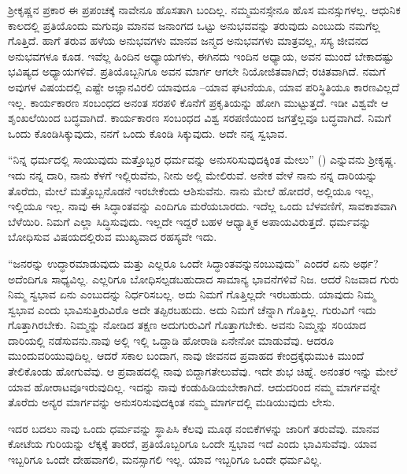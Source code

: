 ಶ‍್ರೀಕೃಷ್ಣನ ಪ್ರಕಾರ ಈ ಪ್ರಪಂಚಕ್ಕೆ ನಾವೇನೂ ಹೊಸತಾಗಿ ಬಂದಿಲ್ಲ. ನಮ್ಮ\break ಮನಸ್ಸೇನೂ ಹೊಸ ಮನಸ್ಸುಗಳಲ್ಲ. ಆಧುನಿಕ ಕಾಲದಲ್ಲಿ ಪ್ರತಿಯೊಂದು ಮಗುವೂ ಮಾನವ ಜನಾಂಗದ ಒಟ್ಟು ಅನುಭವವನ್ನು ತರುವುದು ಎಂಬುದು ನಮಗೆಲ್ಲ ಗೊತ್ತಿದೆ. ಹಾಗೆ ತರುವ ಹಳೆಯ ಅನುಭವಗಳು ಮಾನವ ಜನ್ಮದ ಅನುಭವಗಳು ಮಾತ್ರವಲ್ಲ, ಸಸ್ಯ ಜೀವನದ ಅನುಭವಗಳೂ ಕೂಡ. ಇವೆಲ್ಲ ಹಿಂದಿನ ಅಧ್ಯಾಯಗಳು, ಈಗಿನದು ಇಂದಿನ ಅಧ್ಯಾಯ, ಅವನ ಮುಂದೆ ಬೇಕಾದಷ್ಟು ಭವಿಷ್ಯದ ಅಧ್ಯಾಯಗಳಿವೆ. ಪ್ರತಿಯೊಬ್ಬನಿಗೂ ಅವನ ಮಾರ್ಗ ಆಗಲೇ ನಿಯೋಜಿತವಾಗಿದೆ; ರಚಿತವಾಗಿದೆ. ನಮಗೆ ಅವುಗಳ ವಿಷಯದಲ್ಲಿ ಎಷ್ಟೇ ಅಜ್ಞಾನವಿರಲಿ ಯಾವುದೂ –ಯಾವ ಘಟನೆಯೂ, ಯಾವ ಪರಿಸ್ಥಿತಿಯೂ ಕಾರಣವಿಲ್ಲದೆ ಇಲ್ಲ. ಕಾರ್ಯಕಾರಣ ಸಂಬಂಧದ ಅನಂತ ಸರಪಳಿ ಕೊನೆಗೆ ಪ್ರಕೃತಿಯನ್ನು ಹೋಗಿ ಮುಟ್ಟುತ್ತದೆ. ಇಡೀ ವಿಶ್ವವೇ ಆ ಶೃಂಖಲೆಯಿಂದ ಬದ್ಧವಾಗಿದೆ. ಕಾರ್ಯಕಾರಣ ಸಂಬಂಧದ ವಿಶ್ವ ಸರಪಣಿಯಿಂದ ಜಗತ್ತೆಲ್ಲವೂ ಬದ್ಧವಾಗಿದೆ. ನಿಮಗೆ ಒಂದು ಕೊಂಡಿ\break ಸಿಕ್ಕುವುದು, ನನಗೆ ಒಂದು ಕೊಂಡಿ ಸಿಕ್ಕುವುದು. ಅದೇ ನನ್ನ ಸ್ವಭಾವ.

“ನಿನ್ನ ಧರ್ಮದಲ್ಲಿ ಸಾಯುವುದು ಮತ್ತೊಬ್ಬರ ಧರ್ಮವನ್ನು ಅನುಸರಿಸುವುದಕ್ಕಿಂತ ಮೇಲು” () ಎನ್ನುವನು ಶ‍್ರೀಕೃಷ್ಣ. ಇದು ನನ್ನ ದಾರಿ, ನಾನು ಕೆಳಗೆ ಇಲ್ಲಿರುವೆನು, ನೀನು ಅಲ್ಲಿ ಮೇಲಿರುವೆ. ಅನೇಕ ವೇಳೆ ನಾನು ನನ್ನ ದಾರಿಯನ್ನು ತೊರೆದು, ಮೇಲೆ ಮತ್ತೊಬ್ಬನೊಡನೆ ಇರಬೇಕೆಂದು ಆಶಿಸುವೆನು. ನಾನು ಮೇಲೆ ಹೋದರೆ, ಅಲ್ಲಿಯೂ ಇಲ್ಲ, ಇಲ್ಲಿಯೂ ಇಲ್ಲ. ನಾವು ಈ ಸಿದ್ಧಾಂತವನ್ನು ಎಂದಿಗೂ ಮರೆಯಬಾರದು. ಇದೆಲ್ಲ ಒಂದು ಬೆಳವಣಿಗೆ, ಸಾವಕಾಶವಾಗಿ ಬೆಳೆಯಿರಿ. ನಿಮಗೆ ಎಲ್ಲಾ ಸಿದ್ಧಿಸುವುದು. ಇಲ್ಲದೇ ಇದ್ದರೆ ಬಹಳ ಆಧ್ಯಾತ್ಮಿಕ ಅಪಾಯವಿರುತ್ತದೆ. ಧರ್ಮವನ್ನು ಬೋಧಿಸುವ ವಿಷಯದಲ್ಲಿರುವ ಮುಖ್ಯವಾದ ರಹಸ್ಯವೇ ಇದು.

“ಜನರನ್ನು ಉದ್ಧಾರಮಾಡುವುದು ಮತ್ತು ಎಲ್ಲರೂ ಒಂದೇ ಸಿದ್ಧಾಂತವನ್ನು\break ನಂಬುವುದು” ಎಂದರೆ ಏನು ಅರ್ಥ? ಅದೆಂದಿಗೂ ಸಾಧ್ಯವಿಲ್ಲ. ಎಲ್ಲರಿಗೂ ಬೋಧಿಸಲ್ಪಡಬಹುದಾದ ಸಾಮಾನ್ಯ ಭಾವನೆಗಳಿವೆ ನಿಜ. ಆದರೆ ನಿಜವಾದ ಗುರು ನಿಮ್ಮ ಸ್ವಭಾವ ಏನು ಎಂಬುದನ್ನು ನಿರ್ಧರಿಸಬಲ್ಲ. ಅದು ನಿಮಗೆ ಗೊತ್ತಿಲ್ಲದೇ ಇರಬಹುದು. ಯಾವುದು ನಿಮ್ಮ ಸ್ವಭಾವ ಎಂದು ಭಾವಿಸುತ್ತಿರುವಿರೊ ಅದೇ ತಪ್ಪಿರಬಹುದು. ಅದು ನಿಮಗೆ ಚೆನ್ನಾಗಿ ಗೊತ್ತಿಲ್ಲ. ಗುರುವಿಗೆ ಇದು ಗೊತ್ತಾಗಿರಬೇಕು. ನಿಮ್ಮನ್ನು ನೋಡಿದ ತಕ್ಷಣ ಅದು\break ಗುರುವಿಗೆ ಗೊತ್ತಾಗಬೇಕು. ಅವನು ನಿಮ್ಮನ್ನು ಸರಿಯಾದ ದಾರಿಯಲ್ಲಿ ನಡೆಸುವನು.\break ನಾವು ಅಲ್ಲಿ ಇಲ್ಲಿ ಒದ್ದಾಡಿ ಹೋರಾಡಿ ಏನೇನೋ ಮಾಡುವೆವು. ಆದರೂ ಮುಂದುವರಿ\break ಯುವುದಿಲ್ಲ. ಆದರೆ ಸಕಾಲ ಬಂದಾಗ, ನಾವು ಜೀವನದ ಪ್ರವಾಹದ ಕೇಂದ್ರಕ್ಕೆ\break ಧುಮುಕಿ ಮುಂದೆ ತೇಲಿಕೊಂಡು ಹೋಗುವೆವು. ಆ ಪ್ರವಾಹದಲ್ಲಿ ನಾವು ಬಿದ್ದಾಗ\break ತೇಲುವೆವು. ಇದೇ ಶುಭ ಚಿಹ್ನೆ. ಅನಂತರ ಇನ್ನು ಮೇಲೆ ಯಾವ ಹೋರಾಟವೂ\break ಇರುವುದಿಲ್ಲ. ಇದನ್ನು ನಾವು ಕಂಡುಹಿಡಿಯಬೇಕಾಗಿದೆ. ಆದುದರಿಂದ ನಮ್ಮ ಮಾರ್ಗವನ್ನೇ ತೊರೆದು ಅನ್ಯರ ಮಾರ್ಗವನ್ನು ಅನುಸರಿಸುವುದಕ್ಕಿಂತ ನಮ್ಮ ಮಾರ್ಗದಲ್ಲಿ ಮಡಿಯುವುದು ಲೇಸು.

ಇದರ ಬದಲು ನಾವು ಒಂದು ಧರ್ಮವನ್ನು ಸ್ಥಾಪಿಸಿ ಕೆಲವು ಮೂಢ ನಂಬಿಕೆಗಳನ್ನು ಜಾರಿಗೆ ತರುವೆವು. ಮಾನವ ಕೋಟೆಯ ಗುರಿಯನ್ನು ಲೆಕ್ಕಕ್ಕೆ ತಾರದೆ, ಪ್ರತಿಯೊಬ್ಬರಿಗೂ ಒಂದೇ ಸ್ವಭಾವ ಇದೆ ಎಂದು ಭಾವಿಸುವೆವು. ಯಾವ ಇಬ್ಬರಿಗೂ ಒಂದೇ ದೇಹವಾಗಲಿ, ಮನಸ್ಸಾಗಲಿ ಇಲ್ಲ. ಯಾವ ಇಬ್ಬರಿಗೂ ಒಂದೇ ಧರ್ಮವಿಲ್ಲ.

